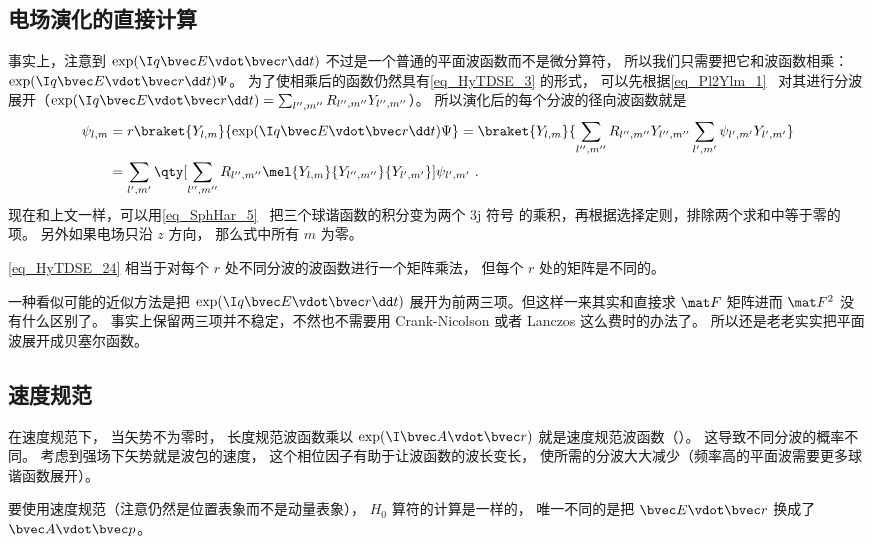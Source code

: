 \subsection{电场演化的直接计算}
事实上，注意到 $\exp(\I q\bvec E\vdot\bvec r\dd t)$ 不过是一个普通的平面波函数而不是微分算符， 所以我们只需要把它和波函数相乘： $\exp(\I q\bvec E\vdot\bvec r\dd t)\Psi$。 为了使相乘后的函数仍然具有\autoref{eq_HyTDSE_3} 的形式， 可以先根据\autoref{eq_Pl2Ylm_1}~ 对其进行分波展开（$\exp(\I q\bvec E\vdot\bvec r\dd t) = \sum_{l'',m''}R_{l'',m''}Y_{l'',m''}$）。 所以演化后的每个分波的径向波函数就是
\begin{equation}\label{eq_HyTDSE_24}
\begin{aligned}
\psi_{l,m} &= r\braket{Y_{l,m}}{\exp(\I q\bvec E\vdot\bvec r\dd t)\Psi} =
\braket{Y_{l,m}}{\sum_{l'',m''} R_{l'',m''} Y_{l'',m''} \sum_{l',m'} \psi_{l',m'} Y_{l',m'}}\\
&= \sum_{l',m'} \qty[\sum_{l'',m''}R_{l'',m''}  \mel{Y_{l,m}}{Y_{l'',m''}}{Y_{l',m'}}]\psi_{l',m'}~.
\end{aligned}
\end{equation}
现在和上文一样，可以用\autoref{eq_SphHar_5}~ 把三个球谐函数的积分变为两个 3j 符号 的乘积，再根据选择定则，排除两个求和中等于零的项。 另外如果电场只沿 $z$ 方向， 那么式中所有 $m$ 为零。

\autoref{eq_HyTDSE_24} 相当于对每个 $r$ 处不同分波的波函数进行一个矩阵乘法， 但每个 $r$ 处的矩阵是不同的。

一种看似可能的近似方法是把 $\exp(\I q\bvec E\vdot\bvec r\dd t)$ 展开为前两三项。但这样一来其实和直接求 $\mat F$ 矩阵进而 $\mat F^2$ 没有什么区别了。 事实上保留两三项并不稳定，不然也不需要用 Crank-Nicolson 或者 Lanczos 这么费时的办法了。 所以还是老老实实把平面波展开成贝塞尔函数。

\subsection{速度规范}\label{sub_HyTDSE_1}
在速度规范下， 当矢势不为零时， 长度规范波函数乘以 $\exp(\I \bvec A \vdot \bvec r)$ 就是速度规范波函数（\au）。 这导致不同分波的概率不同。 考虑到强场下矢势就是波包的速度， 这个相位因子有助于让波函数的波长变长， 使所需的分波大大减少（频率高的平面波需要更多球谐函数展开）。

要使用速度规范（注意仍然是位置表象而不是动量表象）， $H_0$ 算符的计算是一样的， 唯一不同的是把 $\bvec E\vdot \bvec r$ 换成了 $\bvec A\vdot \bvec p$。

